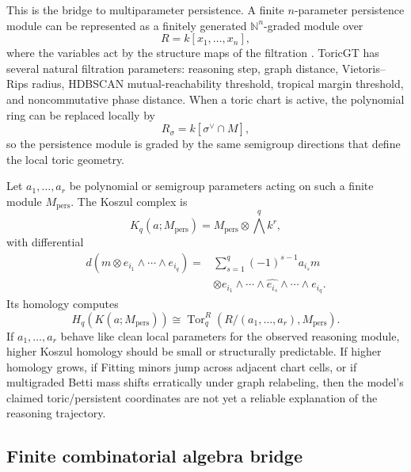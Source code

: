 \documentclass[11pt]{article}
\theoremstyle{definition}
\theoremstyle{plain}
\theoremstyle{remark}
\numberwithin{equation}{section}
\newcommand{\N}{\mathbb{N}}
\begin{document}
This is the bridge to multiparameter persistence.  A finite $n$-parameter persistence module can be represented as a finitely generated $\N^n$-graded module over
\begin{equation}
  R=k[x_1,\ldots,x_n],
\end{equation}
where the variables act by the structure maps of the filtration \cite{schreiber2022multiparameter}.  ToricGT has several natural filtration parameters: reasoning step, graph distance, Vietoris--Rips radius, HDBSCAN mutual-reachability threshold, tropical margin threshold, and noncommutative phase distance.  When a toric chart is active, the polynomial ring can be replaced locally by
\begin{equation}
  R_\sigma=k[\sigma^\vee\cap M],
\end{equation}
so the persistence module is graded by the same semigroup directions that define the local toric geometry.

Let $a_1,\ldots,a_r$ be polynomial or semigroup parameters acting on such a finite module $M_{\mathrm{pers}}$.  The Koszul complex is
\begin{equation}
  K_q(a;M_{\mathrm{pers}})=M_{\mathrm{pers}}\otimes \bigwedge^q k^r,
\end{equation}
with differential
\begin{equation}
\begin{split}
  d(m\otimes e_{i_1}\wedge\cdots\wedge e_{i_q})
  ={}&\sum_{s=1}^q (-1)^{s-1}a_{i_s}m\\
  &\otimes e_{i_1}\wedge\cdots\wedge \widehat{e_{i_s}}\wedge\cdots\wedge e_{i_q}.
\end{split}
\end{equation}
Its homology computes
\begin{equation}
  H_q(K(a;M_{\mathrm{pers}}))\cong
  \operatorname{Tor}^{R}_q(R/(a_1,\ldots,a_r),M_{\mathrm{pers}}).
\end{equation}
If $a_1,\ldots,a_r$ behave like clean local parameters for the observed reasoning module, higher Koszul homology should be small or structurally predictable.  If higher homology grows, if Fitting minors jump across adjacent chart cells, or if multigraded Betti mass shifts erratically under graph relabeling, then the model's claimed toric/persistent coordinates are not yet a reliable explanation of the reasoning trajectory.

\subsection{Finite combinatorial algebra bridge}
\end{document}
